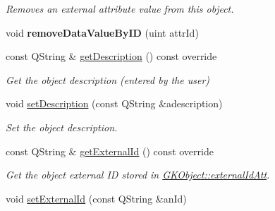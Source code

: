 \begin{DoxyCompactItemize}
\begin{DoxyCompactList}\small\item\em Removes an external attribute value from this object. \end{DoxyCompactList}\item 
void {\bfseries remove\+Data\+Value\+By\+ID} (uint attr\+Id)\hypertarget{classGKObject_a294a9f4d38755b1f9b9a4df321d4e3c7}{}\label{classGKObject_a294a9f4d38755b1f9b9a4df321d4e3c7}

\item 
const Q\+String \& \hyperlink{classGKObject_a855f93b1fcdb8d82aa91ae97c10996b3}{get\+Description} () const override\hypertarget{classGKObject_a855f93b1fcdb8d82aa91ae97c10996b3}{}\label{classGKObject_a855f93b1fcdb8d82aa91ae97c10996b3}

\begin{DoxyCompactList}\small\item\em Get the object description (entered by the user) \end{DoxyCompactList}\item 
void \hyperlink{classGKObject_ab51a1efe5448e85f63777c6f018b8a7d}{set\+Description} (const Q\+String \&adescription)\hypertarget{classGKObject_ab51a1efe5448e85f63777c6f018b8a7d}{}\label{classGKObject_ab51a1efe5448e85f63777c6f018b8a7d}

\begin{DoxyCompactList}\small\item\em Set the object description. \end{DoxyCompactList}\item 
const Q\+String \& \hyperlink{classGKObject_a2b17cb85e8c403b4a91b223bf5f776de}{get\+External\+Id} () const override\hypertarget{classGKObject_a2b17cb85e8c403b4a91b223bf5f776de}{}\label{classGKObject_a2b17cb85e8c403b4a91b223bf5f776de}

\begin{DoxyCompactList}\small\item\em Get the object external ID stored in \hyperlink{classGKBaseObject_a8287b7ae2c1c41363d3ad44dfc53190a}{G\+K\+Object\+::external\+Id\+Att}. \end{DoxyCompactList}\item 
void \hyperlink{classGKObject_a6ac40f8daaae90b1c39de6ce738376ee}{set\+External\+Id} (const Q\+String \&an\+Id)\hypertarget{classGKObject_a6ac40f8daaae90b1c39de6ce738376ee}{}\label{classGKObject_a6ac40f8daaae90b1c39de6ce738376ee}


\end{DoxyCompactItemize}

